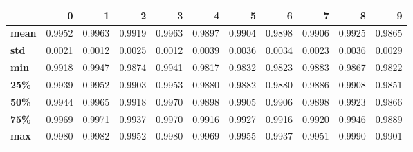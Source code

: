 \begin{tabular}{lrrrrrrrrrr}
\toprule
{} &       0 &       1 &       2 &       3 &       4 &       5 &       6 &       7 &       8 &       9 \\
\midrule
\textbf{mean} &  0.9952 &  0.9963 &  0.9919 &  0.9963 &  0.9897 &  0.9904 &  0.9898 &  0.9906 &  0.9925 &  0.9865 \\
\textbf{std } &  0.0021 &  0.0012 &  0.0025 &  0.0012 &  0.0039 &  0.0036 &  0.0034 &  0.0023 &  0.0036 &  0.0029 \\
\textbf{min } &  0.9918 &  0.9947 &  0.9874 &  0.9941 &  0.9817 &  0.9832 &  0.9823 &  0.9883 &  0.9867 &  0.9822 \\
\textbf{25\% } &  0.9939 &  0.9952 &  0.9903 &  0.9953 &  0.9880 &  0.9882 &  0.9880 &  0.9886 &  0.9908 &  0.9851 \\
\textbf{50\% } &  0.9944 &  0.9965 &  0.9918 &  0.9970 &  0.9898 &  0.9905 &  0.9906 &  0.9898 &  0.9923 &  0.9866 \\
\textbf{75\% } &  0.9969 &  0.9971 &  0.9937 &  0.9970 &  0.9916 &  0.9927 &  0.9916 &  0.9920 &  0.9946 &  0.9889 \\
\textbf{max } &  0.9980 &  0.9982 &  0.9952 &  0.9980 &  0.9969 &  0.9955 &  0.9937 &  0.9951 &  0.9990 &  0.9901 \\
\bottomrule
\end{tabular}
